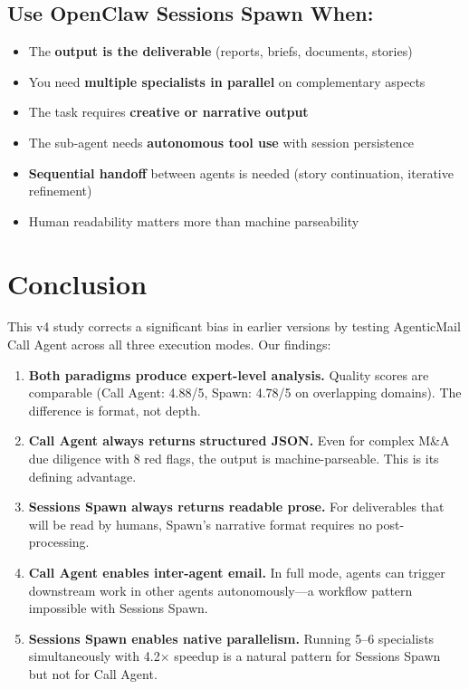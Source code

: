\documentclass[11pt,twocolumn]{article}
\begin{document}
\subsection{Use OpenClaw Sessions Spawn When:}

\begin{itemize}[itemsep=2pt,topsep=4pt]
    \item The \textbf{output is the deliverable} (reports, briefs, documents, stories)
    \item You need \textbf{multiple specialists in parallel} on complementary aspects
    \item The task requires \textbf{creative or narrative output}
    \item The sub-agent needs \textbf{autonomous tool use} with session persistence
    \item \textbf{Sequential handoff} between agents is needed (story continuation, iterative refinement)
    \item Human readability matters more than machine parseability
\end{itemize}

\section{Conclusion}

This v4 study corrects a significant bias in earlier versions by testing AgenticMail Call Agent across all three execution modes. Our findings:

\begin{enumerate}[itemsep=2pt,topsep=4pt]
    \item \textbf{Both paradigms produce expert-level analysis.} Quality scores are comparable (Call Agent: 4.88/5, Spawn: 4.78/5 on overlapping domains). The difference is format, not depth.
    \item \textbf{Call Agent always returns structured JSON.} Even for complex M\&A due diligence with 8 red flags, the output is machine-parseable. This is its defining advantage.
    \item \textbf{Sessions Spawn always returns readable prose.} For deliverables that will be read by humans, Spawn's narrative format requires no post-processing.
    \item \textbf{Call Agent enables inter-agent email.} In full mode, agents can trigger downstream work in other agents autonomously---a workflow pattern impossible with Sessions Spawn.
    \item \textbf{Sessions Spawn enables native parallelism.} Running 5--6 specialists simultaneously with 4.2$\times$ speedup is a natural pattern for Sessions Spawn but not for Call Agent.
\end{enumerate}
\end{document}
